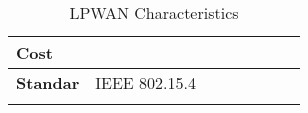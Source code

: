 \begin{longtable}{l|l|l|l|l|l|l|l}
	\bf{Cost}                          & \                &              &              &             &             &                 &                 \\\hline
	\bf{Standar}                       & IEEE 802.15.4    &              &              &             &             &                 &                 \\\hline

\caption{\label{tab:LPWan_characteristics} LPWAN Characteristics \cite{berder_reseaux_2014}}
\end{longtable}

\clearpage
\newpage




